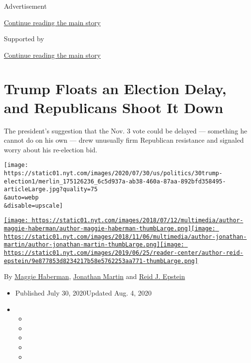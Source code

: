 Advertisement

\protect\hyperlink{after-top}{Continue reading the main story}

Supported by

\protect\hyperlink{after-sponsor}{Continue reading the main story}

\hypertarget{trump-floats-an-election-delay-and-republicans-shoot-it-down}{%
\section{Trump Floats an Election Delay, and Republicans Shoot It
Down}\label{trump-floats-an-election-delay-and-republicans-shoot-it-down}}

The president's suggestion that the Nov. 3 vote could be delayed ---
something he cannot do on his own --- drew unusually firm Republican
resistance and signaled worry about his re-election bid.

\texttt{[image: https://static01.nyt.com/images/2020/07/30/us/politics/30trump-election1/merlin\_175126236\_6c5d937a-ab38-460a-87aa-892bfd358495-articleLarge.jpg?quality=75\\\&auto=webp\\\&disable=upscale]}

\href{https://www.nytimes.com/by/maggie-haberman}{\texttt{[image: https://static01.nyt.com/images/2018/07/12/multimedia/author-maggie-haberman/author-maggie-haberman-thumbLarge.png]}}\href{https://www.nytimes.com/by/jonathan-martin}{\texttt{[image: https://static01.nyt.com/images/2018/11/06/multimedia/author-jonathan-martin/author-jonathan-martin-thumbLarge.png]}}\href{https://www.nytimes.com/by/reid-j-epstein}{\texttt{[image: https://static01.nyt.com/images/2019/06/25/reader-center/author-reid-epstein/9e877853d8234217b58e5762253aa771-thumbLarge.png]}}

By \href{https://www.nytimes.com/by/maggie-haberman}{Maggie Haberman},
\href{https://www.nytimes.com/by/jonathan-martin}{Jonathan Martin} and
\href{https://www.nytimes.com/by/reid-j-epstein}{Reid J. Epstein}

\begin{itemize}
\item
  Published July 30, 2020Updated Aug. 4, 2020
\item
  \begin{itemize}
  \item
  \item
  \item
  \item
  \item
  \end{itemize}
\end{itemize}


